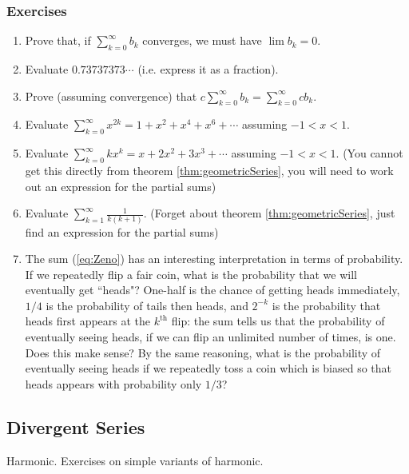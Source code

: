 \subsubsection{Exercises}
\begin{enumerate}
\item Prove that, if  $\sum_{k=0}^{\infty} b_k$ converges, we must have $\lim b_k = 0$.
\item Evaluate $0.73737373\cdots$ (i.e. express it as a fraction).
\item Prove (assuming convergence) that $c\sum_{k=0}^{\infty} b_k = \sum_{k=0}^{\infty} cb_k$.
\item Evaluate $\sum_{k=0}^{\infty} x^{2k} = 1 + x^2 + x^4 + x^6 + \cdots$ assuming $-1<x<1$.
\item Evaluate $\sum_{k=0}^{\infty} kx^k = x + 2x^2 + 3x^3 + \cdots$ assuming $-1<x<1$. (You cannot get this directly from theorem \ref{thm:geometricSeries}, you will need to work out an expression for the partial sums)
\item Evaluate $\sum_{k=1}^{\infty} \frac{1}{k(k+1)}$. (Forget about theorem \ref{thm:geometricSeries}, just find an expression for the partial sums)
\item The sum (\ref{eq:Zeno}) has an interesting interpretation in terms of probability. If we repeatedly flip a fair coin, what is the probability that we will eventually get ``heads"? One-half is the chance of getting heads immediately, $1/4$ is  the probability of tails then heads, and $2^{-k}$ is the probability that heads first appears at the $k^{\mbox{th}}$ flip: the sum tells us that the probability of eventually seeing heads, if we can flip an unlimited number of times, is one. Does this make sense? By the same reasoning, what is the probability of eventually seeing heads if we repeatedly toss a coin which is biased so that heads appears with probability only $1/3$?
\end{enumerate}

\subsection{Divergent Series}
{\color{red}Harmonic. Exercises on simple variants of harmonic.} 



